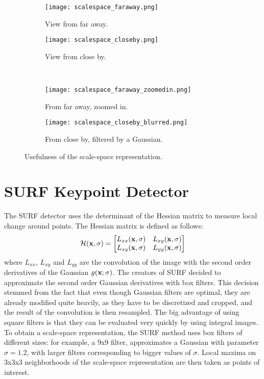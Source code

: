 \begin{figure}[H]
\centering
\begin{subfigure}{.4\textwidth}
  \centering
  \texttt{[image: scalespace\_faraway.png]}
  \caption{View from far away.}
  \label{fig:scalespace_faraway}
\end{subfigure}%
\begin{subfigure}{.4\textwidth}
  \centering
  \texttt{[image: scalespace\_closeby.png]}
  \caption{View from close by.}
  \label{fig:scalespace_closeby}
\end{subfigure} \\
\begin{subfigure}{.4\textwidth}
  \centering
  \texttt{[image: scalespace\_faraway\_zoomedin.png]}
  \caption{From far away, zoomed in.}
  \label{fig:scalespace_faraway_zoomedin}
\end{subfigure}%
\begin{subfigure}{.4\textwidth}
  \centering
  \texttt{[image: scalespace\_closeby\_blurred.png]}
  \caption{From close by, filtered by a Gaussian.}
  \label{fig:scalespace_closeby_blurred}
\end{subfigure}
\caption{Usefulness of the scale-space representation.}
\label{fig:scalespace}
\end{figure}

\section{SURF Keypoint Detector}
The SURF detector uses the determinant of the Hessian matrix to measure local change around points. The Hessian matrix is defined as follows:
\begin{equation}
  \mathcal{H}(\bf{x},\sigma) =  \begin{bmatrix}
  L_{xx}(\bf{x},\sigma) & L_{xy}(\bf{x},\sigma)\\
  L_{xy}(\bf{x},\sigma) & L_{yy}(\bf{x},\sigma)
\end{bmatrix}
\end{equation}
where $L_{xx}$, $L_{xy}$ and $L_{yy}$ are the convolution of the image with the second order derivatives of the Gaussian $g(\bf{x};\sigma)$. The creators of SURF decided to approximate the second order Gaussian derivatives with box filters. This decision stemmed from the fact that even though Gaussian filters are optimal, they are already modified quite heavily, as they have to be discretized and cropped, and the result of the convolution is then resampled. The big advantage of using square filters is that they can be evaluated very quickly by using integral images. To obtain a scale-space representation, the SURF method uses box filters of different sizes: for example, a 9x9 filter, approximates a Gaussian with parameter $\sigma = 1.2$, with larger filters corresponding to bigger values of $\sigma$. Local maxima on 3x3x3 neighborhoods of the scale-space representation are then taken as points of interest.\\

